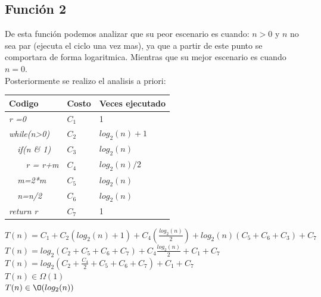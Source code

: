 \documentclass[spanish]{article}
\begin{document}
				\subsection*{Función 2}
					De esta función podemos analizar que su peor escenario es cuando: $n>0$ y $n$ no sea par (ejecuta el ciclo una vez mas), ya que a partir de este punto se comportara de forma logaritmica. Mientras que su mejor escenario es cuando $n=0$.\\
					Posteriormente se realizo el analisis a priori:\\
					\begin{center}
							\begin{table}[H]
								\begin{tabular}{|l|l|l|}
									\hline
									\rowcolor[HTML]{FFCC67} 
									Codigo                           & Costo & Veces ejecutado \\ \hline
									\textit{r =0}                    & $C_1$    & 1               \\ \hline
									\textit{while(n\textgreater{}0)} & $C_2$    & $log_2(n)+1$       \\ \hline
									\textit{\  \  if(n \& 1)}              & $C_3$    & $log_2(n)$         \\ \hline
									\textit{\  \  \  \  r = r+m}                 & $C_4$    & $log_2(n)/2$       \\ \hline
									\textit{\  \  m=2*m}                            & $C_5$    & $log_2(n)$         \\ \hline
									\textit{\  \  n=n/2}                            & $C_6$    & $log_2(n)$         \\ \hline
									\textit{return r}                & $C_7$    & 1               \\ \hline
								\end{tabular}
							\end{table}
								$T(n) = C_1 + C_2(log_2(n)+1) + C_4(\frac{log_2(n)}{2}) + log_2(n)(C_5+C_6+C_3) + C_7$
								$T(n) = log_2(C_2+C_5+C_6+C_7) + C_4\frac{log_2(n)}{2} + C_1 + C_7$
								$T(n) = log_2(C_2+\frac{C_4}{2}+C_5+C_6+C_7) + C_1 + C_7$\\
								$T(n) \in \Omega(1)$\\
								$T(n) \in \O(log_2(n))$
					\end{center}
\end{document}
